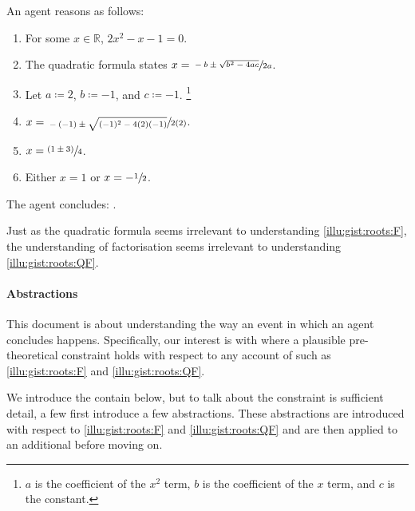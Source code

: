 \begin{note}
  \begin{scenario}%
    \label{illu:gist:roots:QF}%
    An agent reasons as follows:
    \begin{enumerate}[label=\arabic*., ref=(\arabic*)]
    \item
      \label{illu:gist:roots:QF:eq}
      For some \(x \in \mathbb{R}\), \(2x^{2} - x - 1 = 0\).
    \item
      \label{illu:gist:roots:QF:qf}
      The quadratic formula states \(x = \sfrac{-b \pm \sqrt{b^{2} - 4ac}}{2a}\).
    \item
      \label{illu:gist:roots:QF:subs}
      Let \(a \coloneq 2\), \(b \coloneq -1\), and \(c \coloneq -1\).
      \footnote{
        \(a\) is the coefficient of the \(x^{2}\) term, \(b\) is the coefficient of the \(x\) term, and \(c\) is the constant.
      }
    \item
      \label{illu:gist:roots:QF:qf-subs}
      \(x = \sfrac{-(-1) \pm \sqrt{(-1)^{2} - 4(2)(-1)}}{2(2)}\).
    \item
      \label{illu:gist:roots:QF:qf:1}
      \(x = \sfrac{(1 \pm 3)}{4}\).
    \item
      \label{illu:gist:roots:QF:qf:done}
      Either \(x = 1\) or \(x = -\sfrac{1}{2}\).
    \end{enumerate}
    The agent concludes:
    \rootsCon{}.
  \end{scenario}

  \noindent%
  Just as the quadratic formula seems irrelevant to understanding \autoref{illu:gist:roots:F}, the \agents{} understanding of factorisation seems irrelevant to understanding \autoref{illu:gist:roots:QF}.
\end{note}



\paragraph*{Abstractions}


\begin{note}
  This document is about understanding the way an event in which an agent concludes happens.
  Specifically, our interest is with where a plausible pre-theoretical constraint holds with respect to any account of  such as \autoref{illu:gist:roots:F} and \autoref{illu:gist:roots:QF}.

  We introduce the contain below, but to talk about the constraint is sufficient detail, a few first introduce a few abstractions.
  These abstractions are introduced with respect to  \ref{illu:gist:roots:F} and \ref{illu:gist:roots:QF} and are then applied to an additional \scen{} before moving on.
\end{note}



